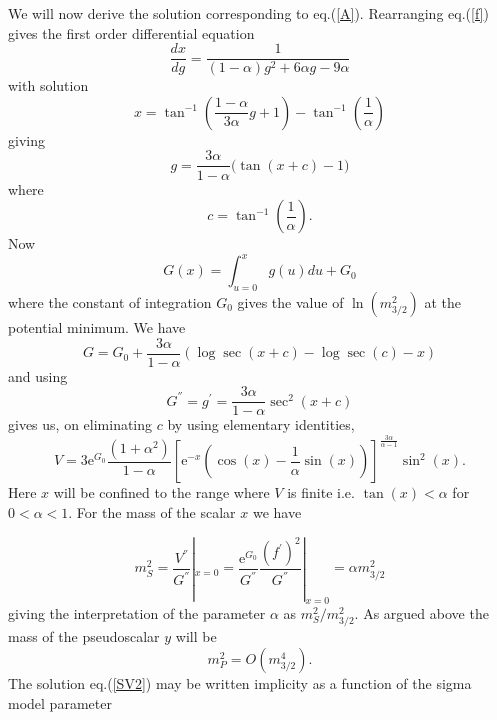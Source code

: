 \documentclass[a4paper,12pt]{article}
\begin{document}
We will now derive the solution corresponding to eq.(\ref{A}).
Rearranging eq.(\ref{f}) gives the first order differential
equation
\begin{equation}\label{x}
    \frac{dx}{dg} = \frac{1}{(1-\alpha)g^{2} + 6\alpha g -9\alpha}
\end{equation}
with solution
\begin{equation}\label{Sx}
    x = \tan^{-1}{(\frac{1-\alpha}{3\alpha}g + 1)} - \tan^{-1}{(\frac{1}{\alpha})}
\end{equation}
giving
\begin{equation}\label{Sg}
    g = \frac{3\alpha}{1-\alpha}(\tan{(x+c)-1)}
\end{equation}
where
\begin{equation}\label{c}
    c =  \tan^{-1}{(\frac{1}{\alpha})}.
\end{equation}
Now
\begin{equation}\label{G}
    G(x) = \int_{u = 0}^{x}g(u) du + G_{0}
\end{equation}
where the constant of integration $G_{0}$ gives the value of
$\ln{(m_{3/2}^{2})}$ at the potential minimum. We have
\begin{equation}\label{SG}
    G = G_{0}  + \frac{3\alpha}{1-
    \alpha}(\log \sec (x+c) - \log \sec (c)-x)
\end{equation}
and using
\begin{equation}\label{Gp}
G^{''} = g^{'} = \frac{3\alpha}{1-\alpha}\sec^{2}{(x+c)}
\end{equation}
gives us, on eliminating $c$ by using elementary identities,
\begin{equation}\label{SV2}
    V =3 \mathrm{e}^{G_{0}}\frac{(1+ \alpha^{2})}{1 - \alpha}[\mathrm{e}^{-x}(\cos{(x)} - \frac{1}{\alpha}\sin{(x)})]^{\frac{
    3\alpha}{\alpha -1}}\sin^{2}{(x)}.
\end{equation}
Here $x$ will be confined to the range where $V$ is finite i.e.
$\tan(x) < \alpha$ for $0 < \alpha < 1$. For the mass of the
scalar $x$ we have

\begin{equation}\label{ms}
m_{S}^{2} = \frac{V^{''}}{G^{''}}|_{x = 0}  =
\frac{\mathrm{e}^{G_{0}}}{G^{''}}
\frac{(f^{'})^{2}}{G^{''}}|_{x=0} = \alpha m_{3/2}^{2}
\end{equation}
giving the interpretation of the parameter $\alpha$ as
$m_{S}^{2}/m_{3/2}^{2}$. As argued above the mass of the
pseudoscalar $y$ will be
\begin{equation}\label{mp}
m_{P}^{2} = O(m_{3/2}^4).
\end{equation}
The solution eq.(\ref{SV2}) may be written implicity as a function
of the sigma model parameter
\end{document}
